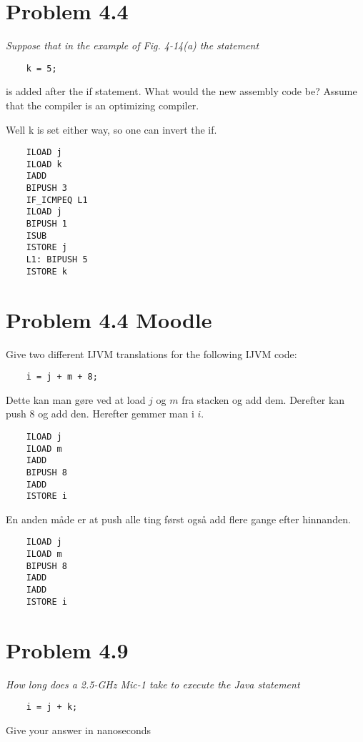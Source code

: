 \section{Problem 4.4}

{\itshape
    Suppose that in the example of Fig. 4-14(a) the statement
\begin{verbatim}
    k = 5;
\end{verbatim}
    is added after the if statement. What would the new assembly code be? Assume that
    the compiler is an optimizing compiler.
}

Well k is set either way, so one can invert the if.

\begin{verbatim}
    ILOAD j
    ILOAD k
    IADD
    BIPUSH 3
    IF_ICMPEQ L1
    ILOAD j
    BIPUSH 1
    ISUB
    ISTORE j
    L1: BIPUSH 5
    ISTORE k
\end{verbatim}

\section{Problem 4.4 Moodle}

\begin{opg}
    Give two different IJVM translations for the following IJVM code:
\begin{verbatim}
    i = j + m + 8;
\end{verbatim}
\end{opg}

Dette kan man gøre ved at load $j$ og $m$ fra stacken og add dem.
Derefter kan push 8 og add den.
Herefter gemmer man i $i$.

\begin{verbatim}
    ILOAD j
    ILOAD m
    IADD
    BIPUSH 8
    IADD
    ISTORE i
\end{verbatim}

En anden måde er at push alle ting først også add flere gange efter hinnanden.

\begin{verbatim}
    ILOAD j
    ILOAD m
    BIPUSH 8
    IADD
    IADD
    ISTORE i
\end{verbatim}

\section{Problem 4.9}

{\itshape
    How long does a 2.5-GHz Mic-1 take to execute the Java statement
\begin{verbatim}
    i = j + k;
\end{verbatim}
    Give your answer in nanoseconds
}

